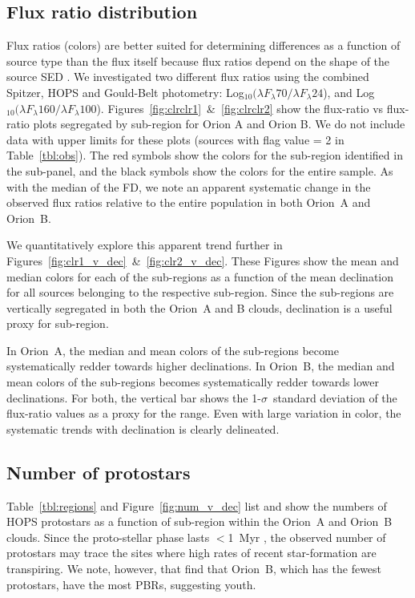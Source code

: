\documentclass[manuscript]{aastex}
\newcommand{\clra}{Log$_{10}(\lambda F_\lambda70/\lambda F_\lambda24$)}
\newcommand{\clrb}{Log$_{10}(\lambda F_\lambda160/\lambda F_\lambda100$)}
\begin{document}
\subsection{Flux ratio distribution}
\label{sec:fratio}
\par
Flux ratios (colors) are better suited for determining differences as a function of source type than the flux itself because flux ratios depend on the shape of the source SED \citep{ali}. We investigated two different flux ratios using the combined Spitzer, HOPS and Gould-Belt photometry: \clra, and \clrb. Figures~\ref{fig:clrclr1}~\&~\ref{fig:clrclr2} show the flux-ratio vs flux-ratio plots segregated by sub-region for Orion A and Orion B. We do not include data with upper limits for these plots (sources with flag value = 2 in Table~\ref{tbl:obs}). The red symbols show the colors for the sub-region identified in the sub-panel, and the black symbols show the colors for the entire sample. As with the median of the FD, we note an apparent systematic change in the observed flux ratios relative to the entire population in both Orion~A and Orion~B.
\par
We quantitatively explore this apparent trend further in Figures~\ref{fig:clr1_v_dec}~\&~\ref{fig:clr2_v_dec}. These Figures show the mean and median colors for each of the sub-regions as a function of the mean declination for all sources belonging to the respective sub-region.  Since the sub-regions are vertically segregated in both the Orion~A and B clouds, declination is a useful proxy for sub-region.
\par
In Orion~A, the median and mean colors of the sub-regions become systematically redder towards higher declinations.  In Orion~B, the median and mean colors of the sub-regions becomes systematically redder towards lower declinations.  For both, the vertical bar shows the 1-$\sigma$\ standard deviation of the flux-ratio values as a proxy for the range.  Even with large variation in color, the systematic trends with declination is clearly delineated.

\subsection{Number of protostars}
\label{sec:numbers}
Table~\ref{tbl:regions} and Figure~\ref{fig:num_v_dec} list and show the numbers of HOPS protostars as a function of sub-region within the Orion~A and Orion~B clouds.  Since the proto-stellar phase lasts $<$1~Myr \citep{orion}, the observed number of protostars may trace the sites where high rates of recent star-formation are transpiring.  We note, however, that \citet{pbrpaper} find that Orion~B, which has the fewest protostars, have the most PBRs, suggesting youth.
\end{document}
